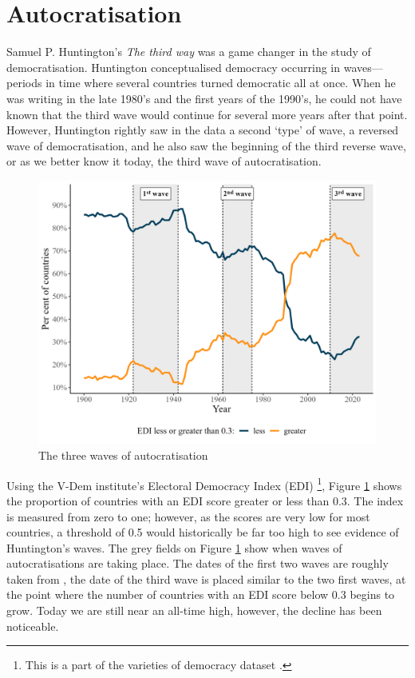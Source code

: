 \section{Autocratisation}
Samuel P. Huntington's \textit{The third way} \citeyearpar{huntington_third_1991} was a game changer in the study of democratisation. Huntington conceptualised democracy occurring in waves---periods in time where several countries turned democratic all at once. When he was writing in the late 1980's and the first years of the 1990's, he could not have known that the third wave would continue for several more years after that point. However, Huntington rightly saw in the data a second `type' of wave, a reversed wave of democratisation, and he also saw the beginning of the third  reverse wave, or as we better know it today, the third wave of autocratisation.

\begin{figure}[hbt!]
\centering
\includegraphics[width = \textwidth]{waves.jpeg}
\caption{\label{fig:autocratisation}The three waves of autocratisation}
\end{figure}

Using the V-Dem institute's Electoral Democracy Index (EDI) \footnote{This is a part of the varieties of democracy dataset \citep{coppedge_v-dem_2024}.}, Figure \ref{fig:autocratisation} shows the proportion of countries with an EDI score greater or less than 0.3. The index is measured from zero to one; however, as the scores are very low for most countries, a threshold of 0.5 would historically be far too high to see evidence of Huntington's waves. The grey fields on Figure \ref{fig:autocratisation} show when waves of autocratisations are taking place. The dates of the first two waves are roughly taken from \citet[p.16]{huntington_third_1991} , the date of the third wave is placed similar to the two first waves, at the point where the number of countries with an EDI score below 0.3 begins to grow. Today we are still near an all-time high, however, the decline has been noticeable. 

